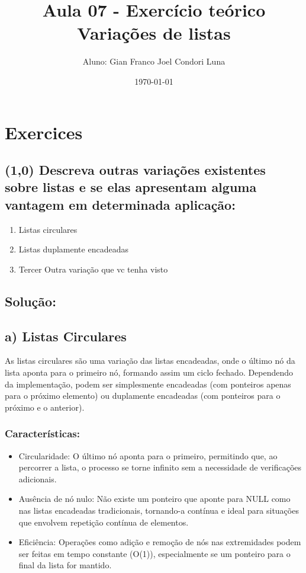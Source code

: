 \documentclass{article}
\title{Aula 07 - Exercício teórico Variações de listas}
\author{Aluno: Gian Franco Joel Condori Luna}
\date{\today}
\begin{document}
\maketitle

\section*{Exercices}
\setcounter{section}{1}
\subsection {(1,0) Descreva outras variações existentes sobre listas e se elas apresentam alguma
vantagem em determinada aplicação:}
\begin{enumerate}[label=\alph*)]
    \item Listas circulares
    \item Listas duplamente encadeadas
    \item Tercer Outra variação que vc tenha visto
\end{enumerate}

\subsection*{Solução:}

\subsection*{a) Listas Circulares}

As listas circulares são uma variação das listas encadeadas, onde o 
último nó da lista aponta para o primeiro nó, formando assim um ciclo 
fechado. Dependendo da implementação, podem ser simplesmente encadeadas 
(com ponteiros apenas para o próximo elemento) ou duplamente encadeadas 
(com ponteiros para o próximo e o anterior).

\subsubsection{Características:}
\begin{itemize}
    \item Circularidade: O último nó aponta para o primeiro, permitindo que, ao percorrer a lista, o processo se torne infinito sem a necessidade de verificações adicionais.
    \item Ausência de nó nulo: Não existe um ponteiro que aponte para NULL como nas listas encadeadas tradicionais, tornando-a contínua e ideal para situações que envolvem repetição contínua de elementos.
    \item Eficiência: Operações como adição e remoção de nós nas extremidades podem ser feitas em tempo constante (O(1)), especialmente se um ponteiro para o final da lista for mantido.
    
\end{itemize}
\end{document}
